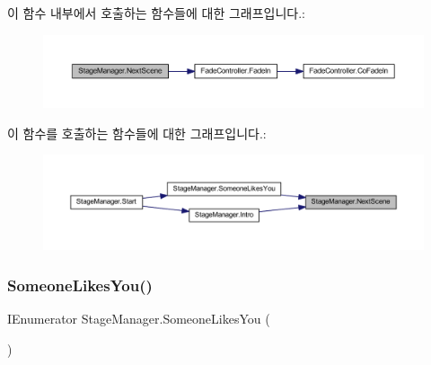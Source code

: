 \begin{DoxyCode}{0}

\end{DoxyCode}
이 함수 내부에서 호출하는 함수들에 대한 그래프입니다.\+:\nopagebreak
\begin{figure}[H]
\begin{center}
\leavevmode
\includegraphics[width=350pt]{da/de4/class_stage_manager_a10d59cedf36dae5138eb9622088fa3dc_cgraph}
\end{center}
\end{figure}
이 함수를 호출하는 함수들에 대한 그래프입니다.\+:\nopagebreak
\begin{figure}[H]
\begin{center}
\leavevmode
\includegraphics[width=350pt]{da/de4/class_stage_manager_a10d59cedf36dae5138eb9622088fa3dc_icgraph}
\end{center}
\end{figure}
\mbox{\label{class_stage_manager_affba879c5906e1bbb53a18263449108c}} 
\subsubsection{\texorpdfstring{SomeoneLikesYou()}{SomeoneLikesYou()}}
{\footnotesize\ttfamily I\+Enumerator Stage\+Manager.\+Someone\+Likes\+You (\begin{DoxyParamCaption}{ }\end{DoxyParamCaption})}



